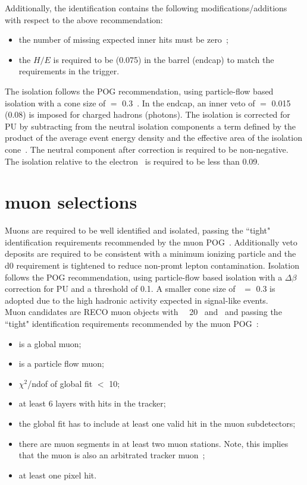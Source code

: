 Additionally, the identification contains the following modifications/additions with respect to the above recommendation:

\begin{itemize}
\item the number of missing expected inner hits must be zero~\cite{conv};

\item the $H/E$ is required to be  (0.075) in the barrel (endcap) to match the requirements in the trigger.
\end{itemize}

The isolation follows the POG recommendation, using particle-flow based isolation with a cone size of \DR  $=$ 0.3~\cite{egammapfisotwiki}.  
In the endcap, an inner veto of \DR $=$ 0.015 (0.08) is imposed for charged hadrons (photons). 
The isolation is corrected for PU by subtracting from the neutral isolation components a term defined by the product of the average event energy density and the effective area of the isolation cone~\cite{egammaisorhoaeff}.  The neutral component after correction is required to be non-negative.  
The isolation relative to the electron \pt\ is required to be less than 0.09.



\section{muon selections}
\label{sec:MuonSelections}
Muons are required to be well identified and isolated, passing the ``tight" identification requirements recommended by the muon POG~\cite{muICHEP2012twiki}. Additionally veto deposits are required to be consistent with a minimum ionizing particle and the d0 requirement is tightened to reduce non-promt lepton contamination.  
Isolation follows the POG recommendation, using  particle-flow based isolation with a $\Delta\beta$ correction for PU and a threshold of 0.1.
A smaller cone size of \DR\ $=$ 0.3 is adopted due to the high hadronic activity expected in signal-like events.\\

Muon candidates are RECO muon objects with \pt\ \gt\ 20 \GeV\ and \absetamu\ and passing the ``tight" identification requirements recommended by the muon POG~\cite{muICHEP2012twiki}:
\begin{itemize}
\item is a global muon;
\item is a particle flow muon;
\item $\chi^2$/ndof of global fit $<$ 10;
\item at least 6 layers with hits in the tracker;
\item the global fit has to include at least one valid hit in the muon subdetectors;
\item there are muon segments in at least two muon stations. Note, this implies that the muon is also an arbitrated tracker muon~\cite{swguidetrackermuonstwiki};
\item at least one pixel hit.
\end{itemize}

